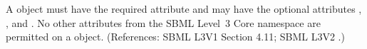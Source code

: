 A \ModifierSpeciesReference object must have the required attribute
 and may have the optional attributes ,
,  and .  No other attributes from the
SBML Level~3 Core namespace are permitted on a \ModifierSpeciesReference
object.  (References: SBML L3V1 Section 4.11; SBML L3V2 .)
